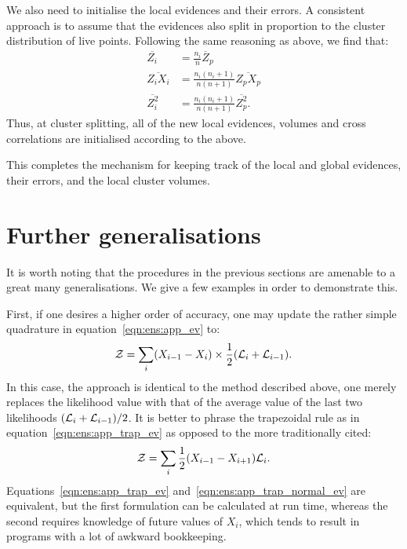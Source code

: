 We also need to initialise the local evidences and their errors. A consistent approach is to assume that the evidences also split in proportion to the cluster distribution of live points. Following the same reasoning as above, we find that:
\begin{align}
  \overline{Z_i}&=  \frac{n_i}{n} \overline Z_p \\
  \overline{Z_i X_i}&= \frac{n_i(n_i+1)}{n(n+1)} \overline{Z_p X_p} \\
  \overline{Z_i^2}  &= \frac{n_i(n_i+1)}{n(n+1)} \overline{Z_p^2}.
\end{align}
Thus, at cluster splitting, all of the new local evidences, volumes and cross correlations are initialised according to the above.

This completes the mechanism for keeping track of the local and global evidences, their errors, and the local cluster volumes.


\section{Further generalisations}

It is worth noting that the procedures in the previous sections are amenable to a great many generalisations. We give a few examples in order to demonstrate this.

First, if one desires a higher order of accuracy, one may update the rather simple quadrature in equation~\eqref{eqn:ens:app_ev} to:
\begin{equation}
  \mathcal{Z} = \sum\limits_{i} (X_{i-1}-X_{i}) \times \frac{1}{2}(\mathcal{L}_i+\mathcal{L}_{i-1}).
  \label{eqn:ens:app_trap_ev}
\end{equation}
In this case, the approach is identical to the method described above, one merely replaces the likelihood value with that of the average value of the last two likelihoods \((\mathcal{L}_i + \mathcal{L}_{i-1})/2\).
It is better to phrase the trapezoidal rule as in equation~\eqref{eqn:ens:app_trap_ev} as opposed to the more traditionally cited:
\begin{equation}
  \mathcal{Z} = \sum\limits_{i} \frac{1}{2}(X_{i-1}-X_{i+1}) \mathcal{L}_i.
  \label{eqn:ens:app_trap_normal_ev}
\end{equation}
Equations~\eqref{eqn:ens:app_trap_ev} and~\eqref{eqn:ens:app_trap_normal_ev} are equivalent, but the first formulation can be calculated at run time, whereas the second requires knowledge of future values of \(X_{i}\), which tends to result in programs with a lot of awkward bookkeeping.

